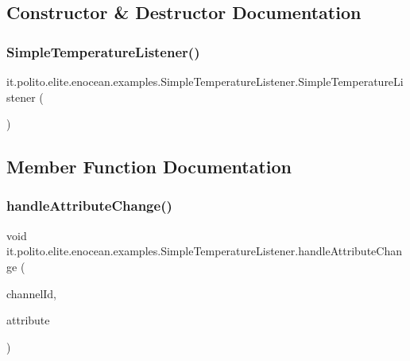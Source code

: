 \subsection{Constructor \& Destructor Documentation}
\hypertarget{classit_1_1polito_1_1elite_1_1enocean_1_1examples_1_1_simple_temperature_listener_a40d02ea70ee69d94e49b4512ee678f8b}{}\label{classit_1_1polito_1_1elite_1_1enocean_1_1examples_1_1_simple_temperature_listener_a40d02ea70ee69d94e49b4512ee678f8b} 
\subsubsection{\texorpdfstring{Simple\+Temperature\+Listener()}{SimpleTemperatureListener()}}
{\footnotesize\ttfamily it.\+polito.\+elite.\+enocean.\+examples.\+Simple\+Temperature\+Listener.\+Simple\+Temperature\+Listener (\begin{DoxyParamCaption}{ }\end{DoxyParamCaption})}



\subsection{Member Function Documentation}
\hypertarget{classit_1_1polito_1_1elite_1_1enocean_1_1examples_1_1_simple_temperature_listener_a48101f4ebbdfd8949b0bee0261737ffe}{}\label{classit_1_1polito_1_1elite_1_1enocean_1_1examples_1_1_simple_temperature_listener_a48101f4ebbdfd8949b0bee0261737ffe} 
\subsubsection{\texorpdfstring{handle\+Attribute\+Change()}{handleAttributeChange()}}
{\footnotesize\ttfamily void it.\+polito.\+elite.\+enocean.\+examples.\+Simple\+Temperature\+Listener.\+handle\+Attribute\+Change (\begin{DoxyParamCaption}\item[{int}]{channel\+Id,  }\item[{\hyperlink{classit_1_1polito_1_1elite_1_1enocean_1_1enj_1_1eep_1_1_e_e_p_attribute}{E\+E\+P\+Attribute}$<$?$>$}]{attribute }\end{DoxyParamCaption})}


